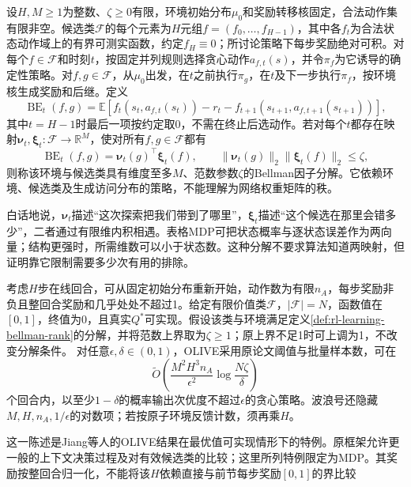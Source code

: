 \begin{definition}[一种Bellman因子分解]
  \label{def:rl-learning-bellman-rank}
  设$H,M\geq1$为整数、$\zeta\geq0$有限，环境初始分布$\mu_0$和奖励转移核固定，合法动作集有限非空。候选类$\mathcal F$的每个元素为$H$元组$f=(f_0,\ldots,f_{H-1})$，其中各$f_t$为合法状态动作域上的有界可测实函数，约定$f_H\equiv0$；所讨论策略下每步奖励绝对可积。对每个$f\in\mathcal F$和时刻$t$，按固定并列规则选择贪心动作$a_{f,t}(s)$，并令$\pi_f$为它诱导的确定性策略。对$f,g\in\mathcal F$，从$\mu_0$出发，在$t$之前执行$\pi_g$，在$t$及下一步执行$\pi_f$，按环境核生成奖励和后继。定义
  \[
    \operatorname{BE}_t(f,g)=\mathbb E[
       f_t(s_t,a_{f,t}(s_t))-r_t
       -f_{t+1}(s_{t+1},a_{f,t+1}(s_{t+1}))],
  \]
  其中$t=H-1$时最后一项按约定取0，不需在终止后选动作。若对每个$t$都存在映射$\bm\nu_t,\bm\xi_t:\mathcal F\to\mathbb R^M$，使对所有$f,g\in\mathcal F$都有
  \[
    \operatorname{BE}_t(f,g)=\bm\nu_t(g)^\top\bm\xi_t(f),\qquad
    \|\bm\nu_t(g)\|_2\|\bm\xi_t(f)\|_2\leq\zeta,
  \]
  则称该环境与候选类具有维度至多$M$、范数参数$\zeta$的Bellman因子分解。它依赖环境、候选类及生成访问分布的策略，不能理解为网络权重矩阵的秩。
\end{definition}

白话地说，$\bm\nu_t$描述“这次探索把我们带到了哪里”，$\bm\xi_t$描述“这个候选在那里会错多少”，二者通过有限维内积相遇。表格MDP可把状态概率与逐状态误差作为两向量；结构更强时，所需维数可以小于状态数。这种分解不要求算法知道两映射，但证明靠它限制需要多少次有用的排除。

\begin{theorem}
  \label{thm:rl-learning-olive}
  考虑$H$步在线回合，可从固定初始分布重新开始，动作数为有限$n_A$，每步奖励非负且整回合奖励和几乎处处不超过1。给定有限价值类$\mathcal F$，$|\mathcal F|=N$，函数值在$[0,1]$，终值为0，且真实$Q^*$可实现。假设该类与环境满足定义\ref{def:rl-learning-bellman-rank}的分解，并将范数上界取为$\zeta\geq1$；原上界不足1时可上调为1，不改变分解条件。
  对任意$\epsilon,\delta\in(0,1)$，OLIVE采用原论文阈值与批量样本数，可在
  \[
    \widetilde O\left(
       \frac{M^2H^3n_A}{\epsilon^2}
                         \log\frac{N\zeta}{\delta}\right)
  \]
  个回合内，以至少$1-\delta$的概率输出次优度不超过$\epsilon$的贪心策略。波浪号还隐藏$M,H,n_A,1/\epsilon$的对数项；若按原子环境反馈计数，须再乘$H$。
\end{theorem}

这一陈述是Jiang等人的OLIVE结果在最优值可实现情形下的特例。原框架允许更一般的上下文决策过程及对有效候选类的比较；这里所列特例限定为MDP。其奖励按整回合归一化，不能将该$H$依赖直接与前节每步奖励$[0,1]$的界比较

